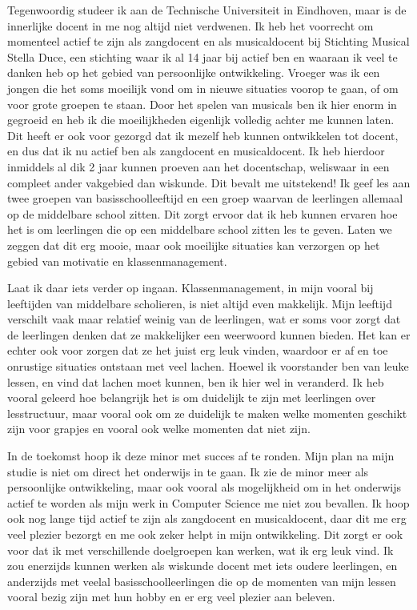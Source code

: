\documentclass{article}
\begin{document}
{                Tegenwoordig studeer ik aan de Technische Universiteit in Eindhoven, maar is de innerlijke docent in me nog altijd niet verdwenen. Ik heb het voorrecht om momenteel actief te zijn als zangdocent en als musicaldocent bij Stichting Musical Stella Duce, een stichting waar ik al 14 jaar bij actief ben en waaraan ik veel te danken heb op het gebied van persoonlijke ontwikkeling. Vroeger was ik een jongen die het soms moeilijk vond om in nieuwe situaties voorop te gaan, of om voor grote groepen te staan. Door het spelen van musicals ben ik hier enorm in gegroeid en heb ik die moeilijkheden eigenlijk volledig achter me kunnen laten. Dit heeft er ook voor gezorgd dat ik mezelf heb kunnen ontwikkelen tot docent, en dus dat ik nu actief ben als zangdocent en musicaldocent. Ik heb hierdoor inmiddels al dik 2 jaar kunnen proeven aan het docentschap, weliswaar in een compleet ander vakgebied dan wiskunde. Dit bevalt me uitstekend! Ik geef les aan twee groepen van basisschoolleeftijd en een groep waarvan de leerlingen allemaal op de middelbare school zitten. Dit zorgt ervoor dat ik heb kunnen ervaren hoe het is om leerlingen die op een middelbare school zitten les te geven. Laten we zeggen dat dit erg mooie, maar ook moeilijke situaties kan verzorgen op het gebied van motivatie en klassenmanagement.
                
                Laat ik daar iets verder op ingaan. Klassenmanagement, in mijn vooral bij leeftijden van middelbare scholieren, is niet altijd even makkelijk. Mijn leeftijd verschilt vaak maar relatief weinig van de leerlingen, wat er soms voor zorgt dat de leerlingen denken dat ze makkelijker een weerwoord kunnen bieden. Het kan er echter ook voor zorgen dat ze het juist erg leuk vinden, waardoor er af en toe onrustige situaties ontstaan met veel lachen. Hoewel ik voorstander ben van leuke lessen, en vind dat lachen moet kunnen, ben ik hier wel in veranderd. Ik heb vooral geleerd hoe belangrijk het is om duidelijk te zijn met leerlingen over lesstructuur, maar vooral ook om ze duidelijk te maken welke momenten geschikt zijn voor grapjes en vooral ook welke momenten dat niet zijn. 
                
                In de toekomst hoop ik deze minor met succes af te ronden. Mijn plan na mijn studie is niet om direct het onderwijs in te gaan. Ik zie de minor meer als persoonlijke ontwikkeling, maar ook vooral als mogelijkheid om in het onderwijs actief te worden als mijn werk in Computer Science me niet zou bevallen. Ik hoop ook nog lange tijd actief te zijn als zangdocent en musicaldocent, daar dit me erg veel plezier bezorgt en me ook zeker helpt in mijn ontwikkeling. Dit zorgt er ook voor dat ik met verschillende doelgroepen kan werken, wat ik erg leuk vind. Ik zou enerzijds kunnen werken als wiskunde docent met iets oudere leerlingen, en anderzijds met veelal basisschoolleerlingen die op de momenten van mijn lessen vooral bezig zijn met hun hobby en er erg veel plezier aan beleven.}
\end{document}
